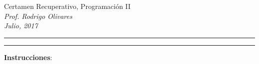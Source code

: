 \documentclass[10pt]{article}
\begin{document}
\begin{center}
    {\Large Certamen Recuperativo, Programaci\'on II} \\
    \emph{\small Prof. Rodrigo Olivares} \\
    \emph{\scriptsize Julio, 2017}
\end{center}
\vspace*{-35pt}
\begin{center}
    \rule{1\textwidth}{.3pt}
\end{center}
\vspace*{-42pt}
\begin{center}
    \rule{1\textwidth}{2pt}
\end{center}

\vspace*{-15pt}
{\small \textbf{Instrucciones}:}
\vspace*{-15pt}
\end{document}
